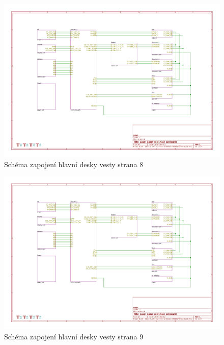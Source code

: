 \begin{landscape}
    \begin{figure}[h]
        \centering
        \includegraphics[page=8, height=\textwidth]{sch/main}
        \caption{Schéma zapojení hlavní desky vesty strana 8}
    \end{figure}
\end{landscape}
\begin{landscape}
    \begin{figure}[h]
        \centering
        \includegraphics[page=9, height=\textwidth]{sch/main}
        \caption{Schéma zapojení hlavní desky vesty strana 9}
    \end{figure}
\end{landscape}
